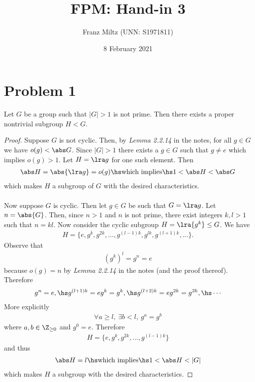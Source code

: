 \documentclass{article}
\begin{document}
\title{FPM: Hand-in 3}
\author{Franz Miltz (UNN: S1971811)}
\date{8 February 2021}
\maketitle

\section*{Problem 1}

\begin{claim*}
    Let $G$ be a group such that $|G|>1$ is not prime. Then
    there exists a proper nontrivial subgroup $H<G$.
\end{claim*}

\begin{proof}
    Suppose $G$ is not cyclic. Then, by \emph{Lemma 2.2.14} in the notes,
    for all $g\in G$ we have $o(g)<\abs G$. Since $|G|>1$ there exists
    a $g\in G$ such that $g\not=e$ which implies $o(g)>1$. 
    Let $H=\lra g$ for one such element. Then
    \begin{align*}
        \abs H = \abs{\lra g} = o(g) \hs\text{which implies}\hs 1 < \abs H < \abs G
    \end{align*}
    which makes $H$ a subgroup of $G$ with 
    the desired characteristics.\\\\
    Now suppose $G$ is cyclic. Then let $g\in G$ be such that
    $G=\lra g$. Let $n=\abs{G}$. Then, since $n>1$ and $n$ is not prime,
    there exist integers $k,l>1$ such that $n=kl$.
    Now consider the cyclic subgroup $H=\lra{g^k}\leq G$. We have
    \begin{align*}
        H =\{e, g^k, g^{2k}, ..., g^{(l-1)k}, g^{lk}, g^{(l+1)k}, ...\}.
    \end{align*} 
    Observe that
    \begin{align*}
        \left(g^k\right)^l = g^n = e
    \end{align*}
    because $o(g)=n$ by \emph{Lemma 2.2.14} in the notes (and the proof
    thereof). Therefore
    \begin{align*}
        g^n = e,\hs g^{(l+1)k} = eg^k = g^k, \hs g^{(l+2)k}=eg^{2k}=g^{2k},\hs \cdots
    \end{align*}
    More explicitly
    \begin{align*}
        \forall a \geq l,\: \exists b<l,\: g^a = g^b
    \end{align*}
    where $a,b\in\Z_{\geq 0}$ and $g^0 = e$. Therefore
    \begin{align*}
        H = \{e, g^k, g^{2k}, ..., g^{(l-1)k}\}
    \end{align*}
    and thus
    \begin{align*}
        \abs H = l \hs\text{which implies}\hs 1 < \abs H < |G|
    \end{align*}
    which makes $H$ a subgroup with the desired characteristics.
\end{proof}
\end{document}
